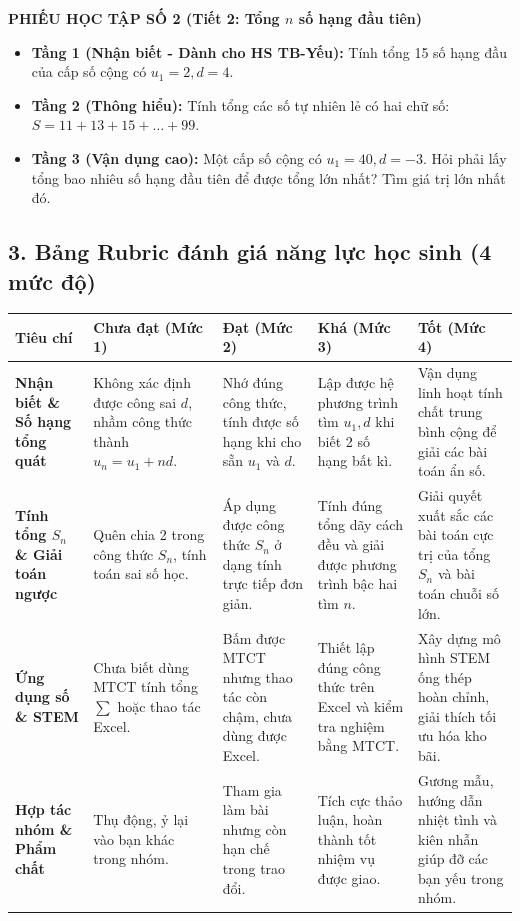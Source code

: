 \documentclass[12pt, a4paper]{article}
\begin{document}
\vspace{5pt}  
\noindent \textbf{PHIẾU HỌC TẬP SỐ 2 (Tiết 2: Tổng $n$ số hạng đầu tiên)}  
\begin{itemize}[leftmargin=0.6cm]  
    \item \textbf{Tầng 1 (Nhận biết - Dành cho HS TB-Yếu):}  
    Tính tổng 15 số hạng đầu của cấp số cộng có $u_1 = 2, d = 4$.  
    \item \textbf{Tầng 2 (Thông hiểu):}  
    Tính tổng các số tự nhiên lẻ có hai chữ số: $S = 11 + 13 + 15 + \dots + 99$.  
    \item \textbf{Tầng 3 (Vận dụng cao):}  
    Một cấp số cộng có $u_1 = 40, d = -3$. Hỏi phải lấy tổng bao nhiêu số hạng đầu tiên để được tổng lớn nhất? Tìm giá trị lớn nhất đó.  
\end{itemize}  
  
\subsection*{3. Bảng Rubric đánh giá năng lực học sinh (4 mức độ)}  
  
\begin{center}  
\small  
\begin{tabularx}{\textwidth}{|p{2.8cm}|X|X|X|X|}  
\hline  
\textbf{Tiêu chí} & \textbf{Chưa đạt (Mức 1)} & \textbf{Đạt (Mức 2)} & \textbf{Khá (Mức 3)} & \textbf{Tốt (Mức 4)} \\ \hline  
\textbf{Nhận biết \& Số hạng tổng quát} & Không xác định được công sai $d$, nhầm công thức thành $u_n = u_1 + nd$. & Nhớ đúng công thức, tính được số hạng khi cho sẵn $u_1$ và $d$. & Lập được hệ phương trình tìm $u_1, d$ khi biết 2 số hạng bất kì. & Vận dụng linh hoạt tính chất trung bình cộng để giải các bài toán ẩn số. \\ \hline  
\textbf{Tính tổng $S_n$ \& Giải toán ngược} & Quên chia 2 trong công thức $S_n$, tính toán sai số học. & Áp dụng được công thức $S_n$ ở dạng tính trực tiếp đơn giản. & Tính đúng tổng dãy cách đều và giải được phương trình bậc hai tìm $n$. & Giải quyết xuất sắc các bài toán cực trị của tổng $S_n$ và bài toán chuỗi số lớn. \\ \hline  
\textbf{Ứng dụng số \& STEM} & Chưa biết dùng MTCT tính tổng $\sum$ hoặc thao tác Excel. & Bấm được MTCT nhưng thao tác còn chậm, chưa dùng được Excel. & Thiết lập đúng công thức trên Excel và kiểm tra nghiệm bằng MTCT. & Xây dựng mô hình STEM ống thép hoàn chỉnh, giải thích tối ưu hóa kho bãi. \\ \hline  
\textbf{Hợp tác nhóm \& Phẩm chất} & Thụ động, ỷ lại vào bạn khác trong nhóm. & Tham gia làm bài nhưng còn hạn chế trong trao đổi. & Tích cực thảo luận, hoàn thành tốt nhiệm vụ được giao. & Gương mẫu, hướng dẫn nhiệt tình và kiên nhẫn giúp đỡ các bạn yếu trong nhóm. \\ \hline  
\end{tabularx}  
\end{center}  
  
\end{document}
